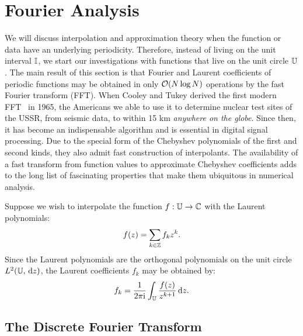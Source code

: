 \chapter{Fourier Analysis}\label{chapter:FourierAnalysis}

We will discuss interpolation and approximation theory when the function or data have an underlying periodicity. Therefore, instead of living on the unit interval $\mathbb{I}$, we start our investigations with functions that live on the unit circle $\mathbb{U}$. The main result of this section is that Fourier and Laurent coefficients of periodic functions may be obtained in only $\mathcal{O}(N\log N)$ operations by the fast Fourier transform (FFT). When Cooley and Tukey derived the first modern FFT~\cite{Cooley-Tukey-19-297-65} in 1965, the Americans we able to use it to determine nuclear test sites of the USSR, from seismic data, to within 15 km {\em anywhere on the globe}. Since then, it has become an indispensable algorithm and is essential in digital signal processing. Due to the special form of the Chebyshev polynomials of the first and second kinds, they also admit fast construction of interpolants. The availability of a fast transform from function values to approximate Chebyshev coefficients adds to the long list of fascinating properties that make them ubiquitous in numerical analysis.

Suppose we wish to interpolate the function $f:\mathbb{U}\to\mathbb{C}$ with the Laurent polynomials:
\begin{equation}
f(z) = \sum_{k\in\mathbb{Z}} f_k z^k.
\end{equation}
Since the Laurent polynomials are the orthogonal polynomials on the unit circle $L^2(\mathbb{U},{\rm\,d} z)$, the Laurent coefficients $f_k$ may be obtained by:
\begin{equation}
f_k = \dfrac{1}{2\pi{\rm i}}\int_{\mathbb{U}} \dfrac{f(z)}{z^{k+1}}{\rm\,d} z.
\end{equation}

\section{The Discrete Fourier Transform}


